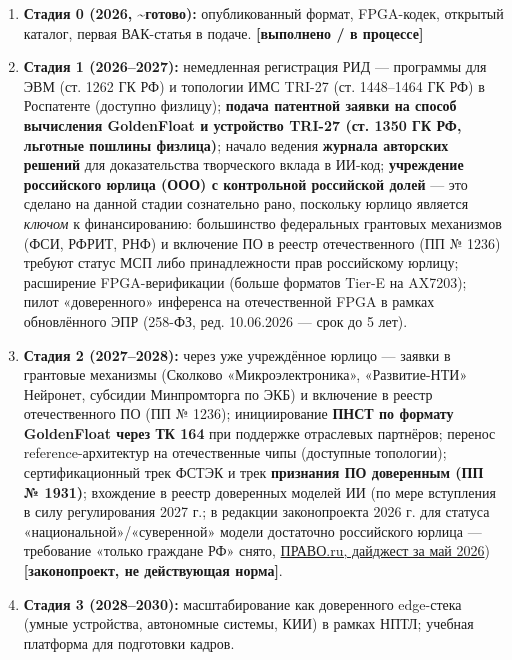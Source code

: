 \documentclass[
  russian,
]{article}
\providecommand{\tightlist}{%
  \setlength{\itemsep}{0pt}\setlength{\parskip}{0pt}}
\begin{document}
\begin{enumerate}
\def\labelenumi{\arabic{enumi}.}
\tightlist
\item
  \textbf{Стадия 0 (2026, \textasciitilde готово):} опубликованный
  формат, FPGA-кодек, открытый каталог, первая ВАК-статья в подаче.
  \textbf{{[}выполнено / в процессе{]}}
\item
  \textbf{Стадия 1 (2026--2027):} немедленная регистрация РИД ---
  программы для ЭВМ (ст. 1262 ГК РФ) и топологии ИМС TRI-27 (ст.
  1448--1464 ГК РФ) в Роспатенте (доступно физлицу); \textbf{подача
  патентной заявки на способ вычисления GoldenFloat и устройство TRI-27
  (ст. 1350 ГК РФ, льготные пошлины физлица)}; начало ведения
  \textbf{журнала авторских решений} для доказательства творческого
  вклада в ИИ-код; \textbf{учреждение российского юрлица (ООО) с
  контрольной российской долей} --- это сделано на данной стадии
  сознательно рано, поскольку юрлицо является \emph{ключом} к
  финансированию: большинство федеральных грантовых механизмов (ФСИ,
  РФРИТ, РНФ) и включение ПО в реестр отечественного (ПП № 1236) требуют
  статус МСП либо принадлежности прав российскому юрлицу; расширение
  FPGA-верификации (больше форматов Tier-E на AX7203); пилот «доверенного» инференса на
  отечественной FPGA в рамках обновлённого ЭПР (258-ФЗ, ред. 10.06.2026
  --- срок до 5 лет).
\item
  \textbf{Стадия 2 (2027--2028):} через уже учреждённое юрлицо ---
  заявки в грантовые механизмы (Сколково «Микроэлектроника»,
  «Развитие-НТИ» Нейронет, субсидии Минпромторга по ЭКБ) и включение в
  реестр отечественного ПО (ПП № 1236); инициирование \textbf{ПНСТ по
  формату GoldenFloat через ТК 164} при поддержке отраслевых партнёров;
  перенос reference-архитектур на отечественные чипы (доступные
  топологии); сертификационный трек ФСТЭК и трек \textbf{признания ПО
  доверенным (ПП № 1931)}; вхождение в реестр доверенных моделей ИИ (по
  мере вступления в силу регулирования 2027 г.; в редакции законопроекта
  2026 г. для статуса «национальной»/«суверенной» модели достаточно
  российского юрлица --- требование «только граждане РФ» снято,
  \href{https://pravo.ru/story/263957/}{ПРАВО.ru, дайджест за май 2026})
  \textbf{{[}законопроект, не действующая норма{]}}.
\item
  \textbf{Стадия 3 (2028--2030):} масштабирование как доверенного
  edge-стека (умные устройства, автономные системы, КИИ) в рамках НПТЛ;
  учебная платформа для подготовки кадров.
\end{enumerate}
\end{document}
